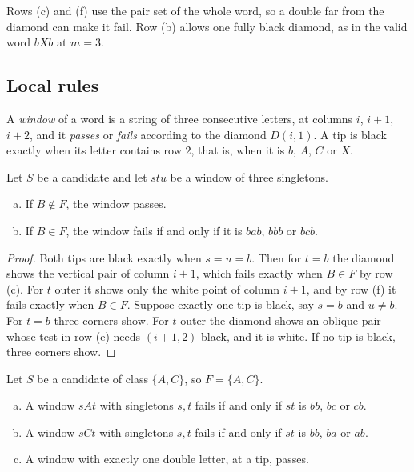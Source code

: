 Rows (c) and (f) use the pair set of the whole word, so a double far from the diamond can
make it fail. Row (b) allows one fully black diamond, as in the valid word $bXb$ at $m=3$.

\subsection{Local rules}

A \emph{window} of a word is a string of three consecutive letters, at columns $i$, $i+1$,
$i+2$, and it \emph{passes} or \emph{fails} according to the diamond $D(i,1)$. A tip is black
exactly when its letter contains row $2$, that is, when it is $b$, $A$, $C$ or $X$.

\begin{lemma}\label{lem:dichotomy}
Let $S$ be a candidate and let $stu$ be a window of three singletons.
\begin{enumerate}[(a)]
\item If $B\notin F$, the window passes.
\item If $B\in F$, the window fails if and only if it is $bab$, $bbb$ or $bcb$.
\end{enumerate}
\end{lemma}

\begin{proof}
Both tips are black exactly when $s=u=b$. Then for $t=b$ the diamond shows the vertical pair
of column $i+1$, which fails exactly when $B\in F$ by row (c). For $t$ outer it shows only
the white point of column $i+1$, and by row (f) it fails exactly when $B\in F$. Suppose
exactly one tip is black, say $s=b$ and $u\ne b$. For $t=b$ three corners show. For $t$ outer
the diamond shows an oblique pair whose test in row (e) needs $(i+1,2)$ black, and it is
white. If no tip is black, three corners show.
\end{proof}

\begin{lemma}\label{lem:sixofnine}
Let $S$ be a candidate of class $\{A,C\}$, so $F=\{A,C\}$.
\begin{enumerate}[(a)]
\item A window $sAt$ with singletons $s,t$ fails if and only if $st$ is $bb$, $bc$ or $cb$.
\item A window $sCt$ with singletons $s,t$ fails if and only if $st$ is $bb$, $ba$ or $ab$.
\item A window with exactly one double letter, at a tip, passes.
\end{enumerate}
\end{lemma}

